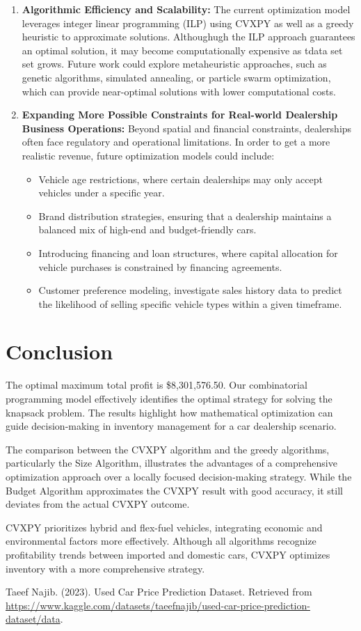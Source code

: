 \documentclass{article}
\begin{document}
\begin{enumerate}
    \item \textbf{Algorithmic Efficiency and Scalability:}
The current optimization model leverages integer linear programming (ILP) using CVXPY as well as a greedy heuristic to approximate solutions. Althoughugh the ILP approach guarantees an optimal solution, it may become computationally expensive as tdata set set grows. Future work could explore metaheuristic approaches, such as genetic algorithms, simulated annealing, or particle swarm optimization, which can provide near-optimal solutions with lower computational costs. 


    \item \textbf{Expanding More Possible Constraints for Real-world Dealership Business Operations:}
    Beyond spatial and financial constraints, dealerships often face regulatory and operational limitations. In order to get a more realistic revenue, future optimization models could include:
\begin{itemize}
    \item Vehicle age restrictions, where certain dealerships may only accept vehicles under a specific year.
    \item Brand distribution strategies, ensuring that a dealership maintains a balanced mix of high-end and budget-friendly cars.
    \item Introducing financing and loan structures, where capital allocation for vehicle purchases is constrained by financing agreements.
    \item Customer preference modeling, investigate sales history data to predict the likelihood of selling specific vehicle types within a given timeframe.
\end{itemize}
\end{enumerate}

\section{Conclusion}
The optimal maximum total profit is \$8,301,576.50. Our combinatorial programming model effectively identifies the optimal strategy for solving the knapsack problem. The results highlight how mathematical optimization can guide decision-making in inventory management for a car dealership scenario.  \par
The comparison between the CVXPY algorithm and the greedy algorithms, particularly the Size Algorithm, illustrates the advantages of a comprehensive optimization approach over a locally focused decision-making strategy. While the Budget Algorithm approximates the CVXPY result with good accuracy, it still deviates from the actual CVXPY outcome.\par
CVXPY prioritizes hybrid and flex-fuel vehicles, integrating economic and environmental factors more effectively. Although all algorithms recognize profitability trends between imported and domestic cars, CVXPY optimizes inventory with a more comprehensive strategy.


\newpage
\begin{thebibliography}{9}
Taeef Najib. (2023). Used Car Price Prediction Dataset. Retrieved from \url{https://www.kaggle.com/datasets/taeefnajib/used-car-price-prediction-dataset/data}.
\end{thebibliography}
\end{document}

